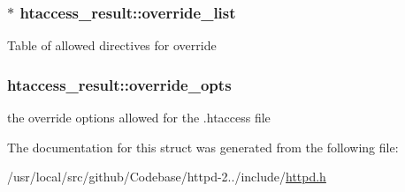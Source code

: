 \subsubsection[{\texorpdfstring{override\+\_\+list}{override_list}}]{$\ast$ htaccess\+\_\+result\+::override\+\_\+list}\hypertarget{structhtaccess__result_a5c8747f6961b50fb842c3a7c8aff0f4a}{}\label{structhtaccess__result_a5c8747f6961b50fb842c3a7c8aff0f4a}
Table of allowed directives for override 
\subsubsection[{\texorpdfstring{override\+\_\+opts}{override_opts}}]{ htaccess\+\_\+result\+::override\+\_\+opts}\hypertarget{structhtaccess__result_adbb318bd9a0fb55ecf52ff32c109acd0}{}\label{structhtaccess__result_adbb318bd9a0fb55ecf52ff32c109acd0}
the override options allowed for the .htaccess file 

The documentation for this struct was generated from the following file\+:\begin{DoxyCompactItemize}
\item 
/usr/local/src/github/\+Codebase/httpd-\/2../include/\hyperlink{httpd_8h}{httpd.\+h}\end{DoxyCompactItemize}
